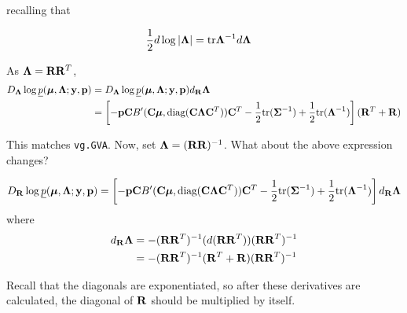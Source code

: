 \documentclass{article}[12pt]
\begin{document}
\noindent recalling that

\begin{align*}
{\frac{1}{2}} d \log |{\boldsymbol \Lambda}| &= \text{tr} {\boldsymbol\Lambda}^{-1} d {\boldsymbol \Lambda}
\end{align*}

\noindent As ${\boldsymbol \Lambda} = {\bf R} {\bf R}^T$,
\begin{align*}
D_{\boldsymbol \Lambda} \log \underline{p}({\boldsymbol \mu}, {\boldsymbol \Lambda}; {\bf y}, {\bf p}) &= D_{\boldsymbol \Lambda} \log \underline{p}({\boldsymbol \mu}, {\boldsymbol \Lambda}; {\bf y}, {\bf p}) d_{\bf R} {\boldsymbol \Lambda} \\
&= \left [-{\bf p} {\bf C} B'({\bf C} {\boldsymbol \mu}, \text{diag}{({\bf C}{\boldsymbol\Lambda}{\bf C}^T)}) {\bf C}^T - {\frac{1}{2}} \text{tr}{({\boldsymbol\Sigma}^{-1})} + {\frac{1}{2}} \text{tr}{({\boldsymbol\Lambda}^{-1})}\right ] ({\bf R}^T + {\bf R})
\end{align*}

\noindent This matches \texttt{vg.GVA}. Now, set ${\boldsymbol \Lambda} = ({\bf R} {\bf R})^{-1}$. What about the
above expression changes?

\[
D_{\bf R} \log \underline{p}({\boldsymbol \mu}, {\boldsymbol \Lambda}; {\bf y}, {\bf p}) = \left [ -{\bf p} {\bf C} B'({\bf C} {\boldsymbol \mu}, \text{diag}{({\bf C}{\boldsymbol\Lambda}{\bf C}^T)}) {\bf C}^T - {\frac{1}{2}} \text{tr}{({\boldsymbol\Sigma}^{-1})} + {\frac{1}{2}} \text{tr}{({\boldsymbol\Lambda}^{-1})} \right ] d_{\bf R} {\boldsymbol \Lambda}
\]
where
\begin{align*}
d_{\bf R} {\boldsymbol \Lambda} &= -({\bf R} {\bf R}^T)^{-1} (d({\bf R} {\bf R}^T)) ({\bf R} {\bf R}^T)^{-1} \\
&=-({\bf R} {\bf R}^T)^{-1} ({\bf R}^T + {\bf R}) ({\bf R} {\bf R}^T)^{-1} \\
\end{align*}

\noindent Recall that the diagonals are exponentiated, so after these derivatives are
calculated, the diagonal of ${\bf R}$ should be multiplied by itself.
\end{document}
